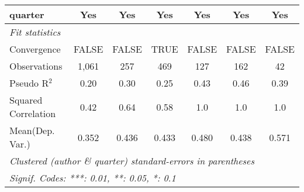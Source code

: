 \begin{tabular}{lcccccc}
   quarter                                                    & Yes           & Yes           & Yes          & Yes            & Yes           & Yes\\  
   \midrule
   \emph{Fit statistics}\\
   Convergence                                                &FALSE          & FALSE         & TRUE         & FALSE          & FALSE         & FALSE\\  
   Observations                                               & 1,061         & 257           & 469          & 127            & 162           & 42\\  
   Pseudo R$^2$                                               & 0.20          & 0.30          & 0.25         & 0.43           & 0.46          & 0.39\\  
   Squared Correlation                                        & 0.42          & 0.64          & 0.58         & 1.0            & 1.0           & 1.0\\  
Mean(Dep. Var.) & 0.352 & 0.436 & 0.433 & 0.480 & 0.438 & 0.571 \\
   \midrule \midrule
   \multicolumn{7}{l}{\emph{Clustered (author \& quarter) standard-errors in parentheses}}\\
   \multicolumn{7}{l}{\emph{Signif. Codes: ***: 0.01, **: 0.05, *: 0.1}}\\
\end{tabular}
\par\endgroup
